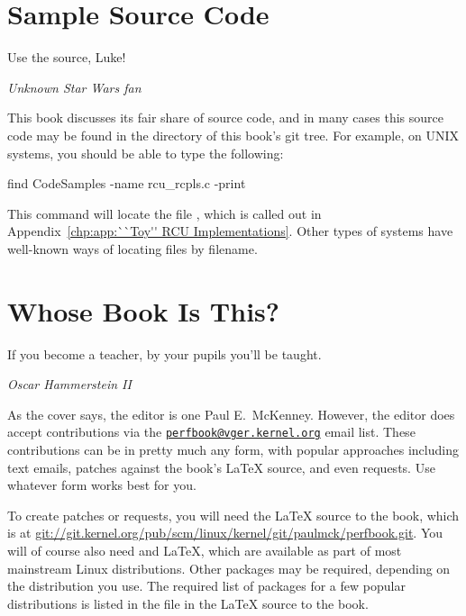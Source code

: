 \iffalse

However, if you are interested in principles of parallel design
for low-level software, especially software written in C, read on!

\fi

\section{Sample Source Code}
\label{sec:howto:Sample Source Code}
%
\epigraph{Use the source, Luke!}{\emph{Unknown Star Wars fan}}

This book discusses its fair share of source code, and in many cases
this source code may be found in the  directory
of this book's git tree.
For example, on UNIX systems, you should be able to type the following:

\begin{VerbatimU}
find CodeSamples -name rcu_rcpls.c -print
\end{VerbatimU}

This command will locate the file , which is called out in
Appendix~\ref{chp:app:``Toy'' RCU Implementations}.
Other types of systems have well-known ways of locating files by filename.

\section{Whose Book Is This?}
\label{sec:howto:Whose Book Is This?}
%
\epigraph{If you become a teacher, by your pupils you'll be taught.}
	 {\emph{Oscar Hammerstein II}}

As the cover says, the editor is one Paul E.~McKenney.
However, the editor does accept contributions via the
\href{mailto:perfbook@vger.kernel.org}
{\nolinkurl{perfbook@vger.kernel.org}} email list.
These contributions can be in pretty much any form, with popular
approaches including text emails,
patches against the book's \LaTeX{} source, and even  requests.
Use whatever form works best for you.

To create patches or  requests, you will need the
\LaTeX{} source to the book, which is at
\url{git://git.kernel.org/pub/scm/linux/kernel/git/paulmck/perfbook.git}.
You will of course also need  and \LaTeX{}, which are
available as part of most mainstream Linux distributions.
Other packages may be required, depending on the distribution you use.
The required list of packages for a few popular distributions is listed
in the file  in the \LaTeX{} source to the book.

